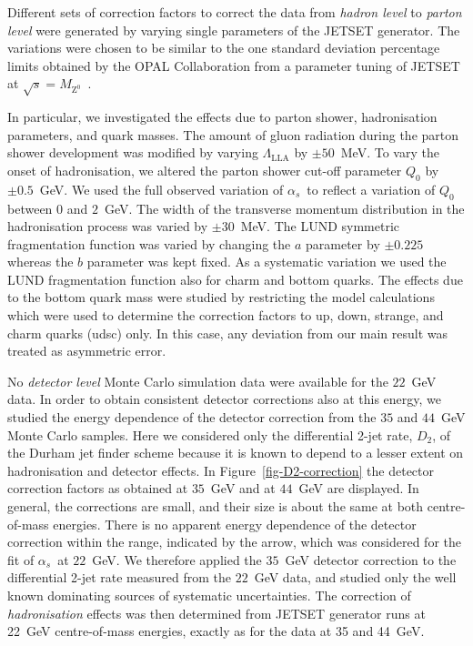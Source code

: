 \documentclass[12pt,a4paper,twoside]{article}
\newcommand{\as}     {\ensuremath{\alpha_s}}
\newcommand{\mz}     {\ensuremath{M_{\mathrm{Z^0}}}}
\begin{document}
Different sets of correction factors to correct the data from {\em
hadron level} to {\em parton level} were generated by varying single
parameters of the JETSET generator.
The variations were chosen to be similar to the one 
standard deviation percentage limits
obtained by the OPAL Collaboration from a parameter 
tuning of JETSET at $\sqrt{s} = \mz$~\cite{bib-OPALtune}. 

In particular, we investigated the effects due to 
parton shower, hadronisation parameters, and quark masses. 
The amount of gluon radiation during the parton shower development was modified by varying 
$\Lambda_{\mathrm{LLA}}$ by $\pm 50$~MeV. 
To vary the onset of hadronisation, we altered the parton shower cut-off 
parameter $Q_0$ by $\pm 0.5$~GeV. We 
used            
the 
full            
observed variation of 
\as\ to reflect a variation of $Q_0$ between $0$ and $2$~GeV.
The width of the transverse momentum distribution 
in the
hadronisation process was varied by $\pm 30$~MeV.
The LUND symmetric fragmentation function was varied by changing the 
$a$ parameter by $\pm 0.225$ whereas the $b$ parameter was 
kept fixed. As a systematic variation we used the LUND
fragmentation function also for charm and bottom quarks.
The effects due to the bottom quark mass were studied by 
restricting the model calculations which were used to determine the
correction factors
to up, down, 
strange, and charm quarks (udsc) only. 
In this case, any deviation 
from our main 
result was treated as asymmetric error.  

No {\em detector level}
Monte Carlo simulation data
were available
for the $22$~GeV data. In order to obtain consistent detector corrections also
at this energy, 
we studied the energy dependence of the
detector correction from the $35$ and $44$~GeV Monte Carlo samples. 
Here 
we considered only the 
differential 2-jet rate, $D_2$, of the Durham jet finder scheme 
because it is known to depend to a lesser extent on hadronisation 
and detector effects. 
In Figure~\ref{fig-D2-correction} the detector correction factors as
obtained at $35$~GeV and 
at $44$~GeV are displayed.
In general, the corrections are small, and 
their size is about the same at 
both centre-of-mass energies. 
There is no apparent energy 
dependence of the detector correction within the range, indicated by the
arrow, which was considered for the fit of \as\ at $22$~GeV.
We therefore applied the $35$~GeV detector correction 
to the differential
2-jet rate measured from the $22$~GeV data, and studied only the 
well known dominating sources of systematic uncertainties.
The correction of {\em hadronisation} effects was then determined from
JETSET generator runs at 22~GeV centre-of-mass energies, exactly as for
the data at 35 and 44~GeV.
\end{document}

